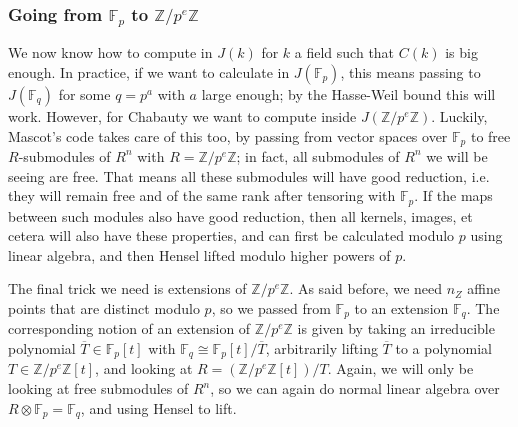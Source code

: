 \documentclass[12pt]{article}
\newcommand{\Z}{\mathbb{Z}}
\newcommand{\F}{\mathbb{F}}
\newcommand{\tensor}{\otimes}
\theoremstyle{plain}
\theoremstyle{definition}
\theoremstyle{remark}
\begin{document}
\subsubsection{Going from \texorpdfstring{$\F_p$}{Fp} to \texorpdfstring{$\Z/p^e\Z$}{Z/peZ}}
We now know how to compute in $J(k)$ for $k$ a field such that $C(k)$ is big enough. In practice, if we want to calculate in $J(\F_p)$, this means passing to $J(\F_q)$ for some $q = p^a$ with $a$ large enough; by the Hasse-Weil bound this will work. However, for Chabauty we want to compute inside $J(\Z/p^e\Z)$. Luckily, Mascot's code takes care of this too, by passing from vector spaces over $\F_p$ to free $R$-submodules of $R^n$ with $R = \Z/p^e\Z$; in fact, all submodules of $R^n$ we will be seeing are free. That means all these submodules will have good reduction, i.e. they will remain free and of the same rank after tensoring with $\F_p$. If the maps between such modules also have good reduction, then all kernels, images, et cetera will also have these properties, and can first be calculated modulo $p$ using linear algebra, and then Hensel lifted modulo higher powers of $p$.

The final trick we need is extensions of $\Z/p^e\Z$. As said before, we need $n_Z$ affine points that are distinct modulo $p$, so we passed from $\F_p$ to an extension $\F_q$. The corresponding notion of an extension of $\Z/p^e\Z$ is given by taking an irreducible polynomial $\overline{T} \in \F_p[t]$ with $\F_q \cong \F_p[t]/\overline{T}$, arbitrarily lifting $\overline{T}$ to a polynomial $T \in \Z/p^e\Z[t]$, and looking at $R = (\Z/p^e\Z[t])/T$. Again, we will only be looking at free submodules of $R^n$, so we can again do normal linear algebra over $R \tensor \F_p = \F_q$, and using Hensel to lift.
\end{document}
